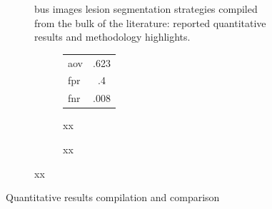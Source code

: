 \begin{figure}[h]
  \begin{subfigure}[b]{\textwidth}
    {\tiny }
    \caption{\ac{bus} images lesion segmentation strategies compiled from the bulk of the literature: reported quantitative results and methodology highlights.}
    \label{fig:surveyResults:survey}
  \end{subfigure}
  \begin{subfigure}[b]{\textwidth}
    \begin{subfigure}[b]{0.2\textwidth}
      \begin{tabular}{lc}
        \ac{aov}& .623 \\
        \ac{fpr}& .4 \\
        \ac{fnr}& .008 \\
      \end{tabular}
      \caption{xx}
      \label{fig:surveyResults:method}
    \end{subfigure}
    \begin{subfigure}[b]{0.8\textwidth}
      {\tiny  }
      \caption{{\small xx}}
      \label{fig:surveyResults:comparison}
    \end{subfigure}
  \end{subfigure}
  \hfill
  \caption{Quantitative results compilation and comparison}
  \label{fig:surveyResults}
\end{figure}


